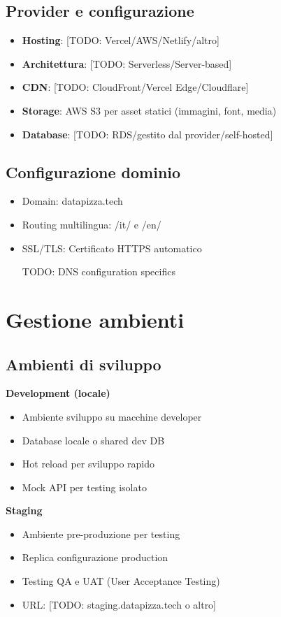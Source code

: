 \subsection{Provider e configurazione}
\begin{itemize}
  \item \textbf{Hosting}: [TODO: Vercel/AWS/Netlify/altro]
  \item \textbf{Architettura}: [TODO: Serverless/Server-based]
  \item \textbf{CDN}: [TODO: CloudFront/Vercel Edge/Cloudflare]
  \item \textbf{Storage}: AWS S3 per asset statici (immagini, font, media)
  \item \textbf{Database}: [TODO: RDS/gestito dal provider/self-hosted]
\end{itemize}

\subsection{Configurazione dominio}
\begin{itemize}
  \item Domain: datapizza.tech
  \item Routing multilingua: /it/ e /en/
  \item SSL/TLS: Certificato HTTPS automatico
  \item [TODO: DNS configuration specifics]
\end{itemize}

\section{Gestione ambienti}
\subsection{Ambienti di sviluppo}
\textbf{Development (locale)}
\begin{itemize}
  \item Ambiente sviluppo su macchine developer
  \item Database locale o shared dev DB
  \item Hot reload per sviluppo rapido
  \item Mock API per testing isolato
\end{itemize}

\textbf{Staging}
\begin{itemize}
  \item Ambiente pre-produzione per testing
  \item Replica configurazione production
  \item Testing QA e UAT (User Acceptance Testing)
  \item URL: [TODO: staging.datapizza.tech o altro]
\end{itemize}

